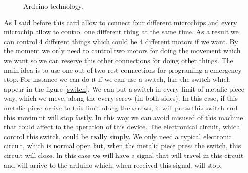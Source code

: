 \begin{itemize}
\begin{figure}[hbtp]
 \centering
 \caption{Arduino technology. \label{technology}}
\end{figure}

As I said before this card allow to connect four different microchips and every microchip allow to control one different thing at the same time. As a result we can control 4 different things which could be 4 different motors if we want. By the moment we only need to control two motors for doing the movement which we want so we can reserve this other connections for doing other things. The main idea is to use one out of two rest connections for programing a emergency stop. For instance we can do it if we can use a switch, like the switch which appear in the figure \ref{switch}. We can put a switch in every limit of metalic piece way, which we move, along the every screw (in both sides). In this case, if this metalic piece arrive to this limit along the screws, it will press this switch and this movimint will stop fastly. In this way we can avoid misused of this machine that could affect to the operation of this device. The electronical circuit, which control this switch, could be really simply. We only need a typical electronic circuit, which is normal open but, when the metalic piece press the switch, this circuit will close. In this case we will have a signal that will travel in this circuit and will arrive to the arduino which, when received this signal, will stop.



\end{itemize}
